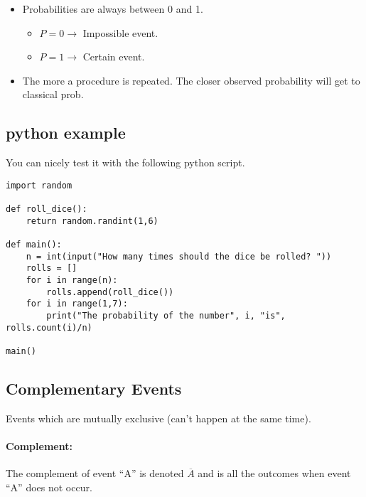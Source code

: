 \documentclass{book}
\begin{document}


\begin{itemize}
    \item Probabilities are always between 0 and 1.
        \begin{itemize}
            \item $P=0 \to$ Impossible event.
            \item $P=1 \to$ Certain event.
        \end{itemize}
    \item The more a procedure is repeated. The closer observed probability will get to classical prob.
\end{itemize}

\subsection{python example}
You can nicely test it with the following python script.
\begin{verbatim}
import random

def roll_dice():
    return random.randint(1,6)

def main():
    n = int(input("How many times should the dice be rolled? "))
    rolls = []
    for i in range(n):
        rolls.append(roll_dice())
    for i in range(1,7):
        print("The probability of the number", i, "is", rolls.count(i)/n)

main()
\end{verbatim}

\subsection{Complementary Events}
Events which are mutually exclusive (can't happen at the same time).

\paragraph{Complement:} The complement of event ``A'' is denoted $\overline{A}$
and is all the outcomes when event ``A'' does not occur.
\end{document}
